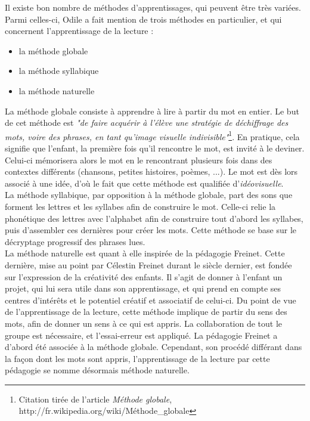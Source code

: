 Il existe bon nombre de méthodes d'apprentissages, qui peuvent être très variées. Parmi celles-ci, Odile a fait mention de trois méthodes en particulier, et qui concernent l'apprentissage de la lecture :
\begin{itemize}
\item la méthode globale
\item la méthode syllabique
\item la méthode naturelle\\
\end{itemize} 

La méthode globale consiste à apprendre à lire à partir du mot en entier. Le but de cet méthode est \textit{"de faire acquérir à l'élève une stratégie de déchiffrage des mots, voire des phrases, en tant qu'image visuelle indivisible"}\footnote{Citation tirée de l'article \textit{Méthode globale}, http://fr.wikipedia.org/wiki/Méthode\_globale}. En pratique, cela signifie que l'enfant, la première fois qu'il rencontre le mot, est invité à le deviner. Celui-ci mémorisera alors le mot en le rencontrant plusieurs fois dans des contextes différents (chansons, petites histoires, poèmes, ...). Le mot est dès lors associé à une idée, d'où le fait que cette méthode est qualifiée d'\textit{idéovisuelle}.\\

La méthode syllabique, par opposition à la méthode globale, part des sons que forment les lettres et les syllabes afin de construire le mot. Celle-ci relie la phonétique des lettres avec l'alphabet afin de construire tout d'abord les syllabes, puis d'assembler ces dernières pour créer les mots. Cette méthode se base sur le décryptage progressif des phrases lues.\\

La méthode naturelle est quant à elle inspirée de la pédagogie Freinet. Cette dernière, mise au point par Célestin Freinet durant le siècle dernier, est fondée sur l'expression de la créativité des enfants. Il s'agit de donner à l'enfant un projet, qui lui sera utile dans son apprentissage, et qui prend en compte ses centres d'intérêts et le potentiel créatif et associatif de celui-ci. Du point de vue de l'apprentissage de la lecture, cette méthode implique de partir du sens des mots, afin de donner un sens à ce qui est appris. La collaboration de tout le groupe est nécessaire, et l'essai-erreur est appliqué. La pédagogie Freinet a d'abord été associée à la méthode globale. Cependant, son procédé différant dans la façon dont les mots sont appris, l'apprentissage de la lecture par cette pédagogie se nomme désormais méthode naturelle.\\


